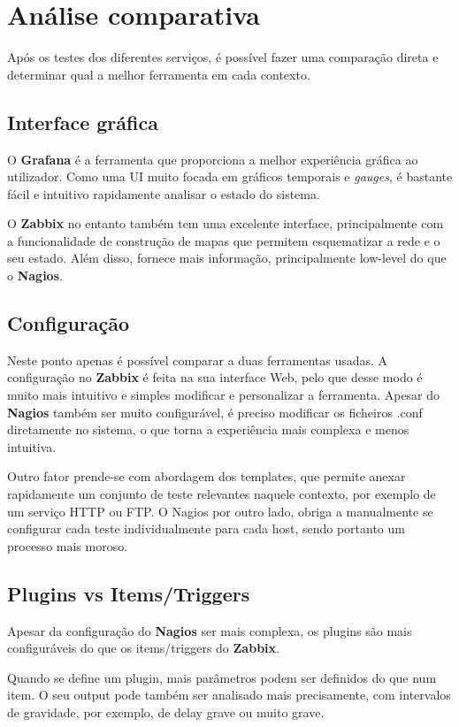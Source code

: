 \chapter{Análise comparativa}

Após os testes dos diferentes serviços, é possível fazer uma comparação direta e determinar qual a melhor ferramenta em cada contexto.


\section*{Interface gráfica}

O \textbf{Grafana} é a ferramenta que proporciona a melhor experiência gráfica ao utilizador.
Como uma UI muito focada em gráficos temporais e \textit{gauges}, é bastante fácil e intuitivo rapidamente analisar o estado do sistema.

O \textbf{Zabbix} no entanto também tem uma excelente interface, principalmente com a funcionalidade de construção de mapas que permitem esquematizar a rede e o seu estado.
Além disso, fornece mais informação, principalmente low-level do que o \textbf{Nagios}.

\section*{Configuração}
Neste ponto apenas é possível comparar a duas ferramentas usadas.
A configuração no \textbf{Zabbix} é feita na sua interface Web, pelo que desse modo é muito mais intuitivo e simples modificar e personalizar a ferramenta.
Apesar do \textbf{Nagios} também ser muito configurável, é preciso modificar os ficheiros .conf diretamente no sistema, o que torna a experiência mais complexa e menos intuitiva.

Outro fator prende-se com abordagem dos templates, que permite anexar rapidamente um conjunto de teste relevantes naquele contexto, por exemplo de um serviço HTTP ou FTP.
O Nagios por outro lado, obriga a manualmente se configurar cada teste individualmente para cada host, sendo portanto um processo mais moroso.

\section*{Plugins vs Items/Triggers}
Apesar da configuração do \textbf{Nagios} ser mais complexa, os plugins são mais configuráveis do que os items/triggers do \textbf{Zabbix}.

Quando se define um plugin, mais parâmetros podem ser definidos do que num item.
O seu output pode também ser analisado mais precisamente, com intervalos de gravidade, por exemplo, de delay grave ou muito grave.

